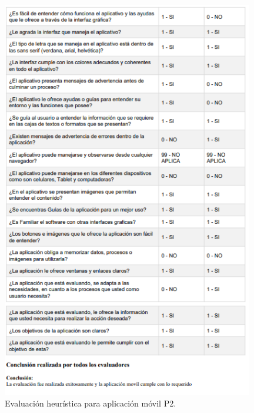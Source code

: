 \documentclass[12pt,letterpaper,openany]{book}
\begin{document}
\begin{figure}[H]
\begin{center}
\includegraphics[width=11cm]{./imagenes/R2}
\caption{Evaluación heurística para aplicación móvil P2.}
\end{center}
\end{figure}

\end{document}
